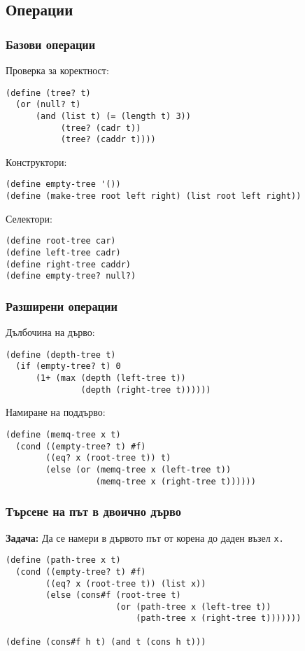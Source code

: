 \documentclass{beamer}
\begin{document}
\subsection{Операции}

\begin{frame}[fragile]
  \frametitle{Базови операции}

  Проверка за коректност:
  \pause
\begin{lstlisting}
(define (tree? t)
  (or (null? t)
      (and (list t) (= (length t) 3))
           (tree? (cadr t))
           (tree? (caddr t))))
\end{lstlisting}
  \pause
  Конструктори:
  \pause
\begin{lstlisting}
(define empty-tree '())
(define (make-tree root left right) (list root left right))
\end{lstlisting}
  \pause
  Селектори:
  \pause
\begin{lstlisting}
(define root-tree car)
(define left-tree cadr)
(define right-tree caddr)
(define empty-tree? null?)
\end{lstlisting}
\end{frame}

\begin{frame}[fragile]
  \frametitle{Разширени операции}

  Дълбочина на дърво:
  \pause
\begin{lstlisting}
(define (depth-tree t)
  (if (empty-tree? t) 0
      (1+ (max (depth (left-tree t))
               (depth (right-tree t))))))
\end{lstlisting}
  \pause
  Намиране на поддърво:
  \pause
\begin{lstlisting}
(define (memq-tree x t)
  (cond ((empty-tree? t) #f)
        ((eq? x (root-tree t)) t)
        (else (or (memq-tree x (left-tree t))
                  (memq-tree x (right-tree t))))))
\end{lstlisting}
\end{frame}

\begin{frame}[fragile]
  \frametitle{Търсене на път в двоично дърво}

  \textbf{Задача:} Да се намери в дървото път от корена до даден възел \tt x.
  \pause
\begin{lstlisting}
(define (path-tree x t)
  (cond ((empty-tree? t) #f)
        ((eq? x (root-tree t)) (list x))
        (else (cons#f (root-tree t)
                      (or (path-tree x (left-tree t))
                          (path-tree x (right-tree t)))))))

(define (cons#f h t) (and t (cons h t)))
\end{lstlisting}
\end{frame}
\end{document}

